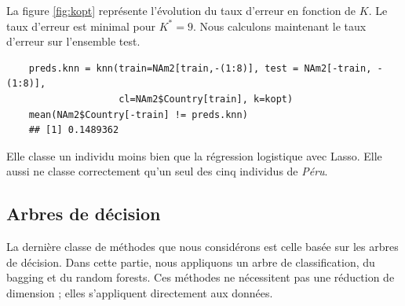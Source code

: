 \documentclass[12pt,a4paper]{article}
\begin{document}
La figure \ref{fig:kopt} représente l'évolution du taux d'erreur en fonction de $K$. Le taux d'erreur est minimal pour $K^* = 9$. Nous calculons maintenant le taux d'erreur sur l'ensemble test. \vspace{2mm}
\begin{lstlisting}
	preds.knn = knn(train=NAm2[train,-(1:8)], test = NAm2[-train, -(1:8)],
	                cl=NAm2$Country[train], k=kopt)
	mean(NAm2$Country[-train] != preds.knn)
	## [1] 0.1489362
\end{lstlisting}
Elle classe un individu moins bien que la régression logistique avec Lasso. Elle aussi ne classe correctement qu'un seul des cinq individus de \textit{Péru}.
\subsection{Arbres de décision}
La dernière classe de méthodes que nous considérons est celle basée sur les arbres de décision. Dans cette partie, nous appliquons un arbre de classification, du bagging et du random forests. Ces méthodes ne nécessitent pas une réduction de dimension ; elles s'appliquent directement aux données.
\end{document}
